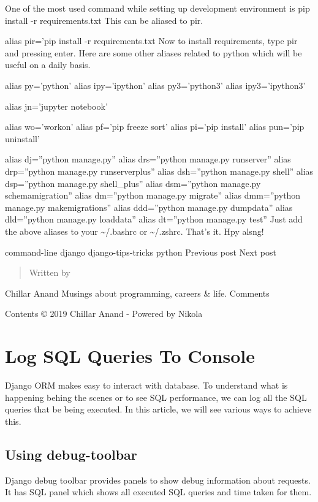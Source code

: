 \documentclass[a5paper,10pt,english]{sphinxmanual}
\begin{document}
One of the most used command while setting up development environment is pip install -r requirements.txt This can be aliased to pir.

alias pir=’pip install -r requirements.txt
Now to install requirements, type pir and pressing enter. Here are some other aliases related to python which will be useful on a daily basis.

alias py=’python’
alias ipy=’ipython’
alias py3=’python3’
alias ipy3=’ipython3’

alias jn=’jupyter notebook’

alias wo=’workon’
alias pf=’pip freeze \textbar{} sort’
alias pi=’pip install’
alias pun=’pip uninstall’

alias dj=”python manage.py”
alias drs=”python manage.py runserver”
alias drp=”python manage.py runserverplus”
alias dsh=”python manage.py shell”
alias dsp=”python manage.py shell\_plus”
alias dsm=”python manage.py schemamigration”
alias dm=”python manage.py migrate”
alias dmm=”python manage.py makemigrations”
alias ddd=”python manage.py dumpdata”
alias dld=”python manage.py loaddata”
alias dt=”python manage.py test”
Just add the above aliases to your \textasciitilde{}/.bashrc or \textasciitilde{}/.zshrc. That’s it. Hpy alsng!

command-line django django-tips-tricks python
Previous post Next post
\begin{quote}

Written by
\end{quote}

Chillar Anand
Musings about programming, careers \& life.
Comments

Contents © 2019 Chillar Anand - Powered by Nikola


\chapter{Log SQL Queries To Console}
\label{\detokenize{orm_log_sql:log-sql-queries-to-console}}\label{\detokenize{orm_log_sql::doc}}
Django ORM makes easy to interact with database. To understand what is happening behing the scenes or to see SQL performance, we can log all the SQL queries that be being executed. In this article, we will see various ways to achieve this.


\section{Using debug-toolbar}
\label{\detokenize{orm_log_sql:using-debug-toolbar}}
Django debug toolbar provides panels to show debug information about requests. It has SQL panel which shows all executed SQL queries and time taken for them.
\end{document}
